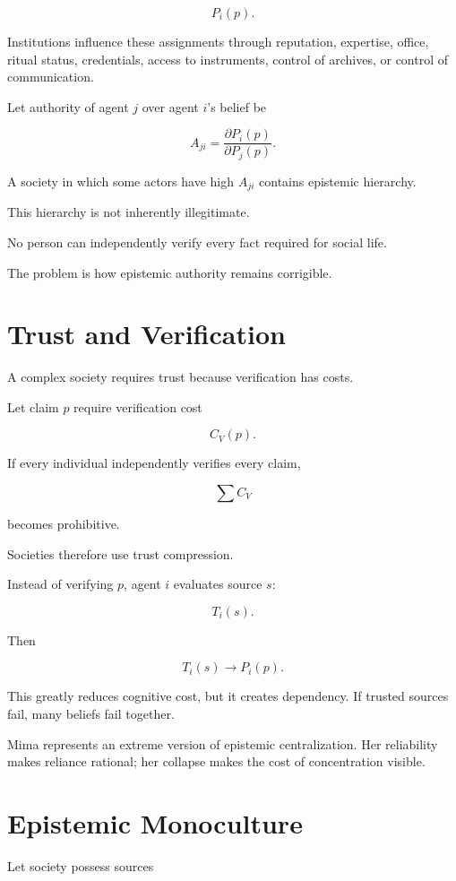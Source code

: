 \documentclass[11pt,oneside]{book}
\theoremstyle{definition}
\theoremstyle{remark}
\begin{document}
\[
P_i(p).
\]

Institutions influence these assignments through reputation, expertise, office, ritual status, credentials, access to instruments, control of archives, or control of communication.

Let authority of agent \(j\) over agent \(i\)'s belief be

\[
A_{ji}
=
\frac{\partial P_i(p)}
{\partial P_j(p)}.
\]

A society in which some actors have high \(A_{ji}\) contains epistemic hierarchy.

This hierarchy is not inherently illegitimate.

No person can independently verify every fact required for social life.

The problem is how epistemic authority remains corrigible.

\section{Trust and Verification}

A complex society requires trust because verification has costs.

Let claim \(p\) require verification cost

\[
C_V(p).
\]

If every individual independently verifies every claim,

\[
\sum C_V
\]

becomes prohibitive.

Societies therefore use trust compression.

Instead of verifying \(p\), agent \(i\) evaluates source \(s\):

\[
T_i(s).
\]

Then

\[
T_i(s)
\rightarrow
P_i(p).
\]

This greatly reduces cognitive cost, but it creates dependency. If trusted sources fail, many beliefs fail together.

Mima represents an extreme version of epistemic centralization. Her reliability makes reliance rational; her collapse makes the cost of concentration visible.

\section{Epistemic Monoculture}

Let society possess sources
\end{document}
